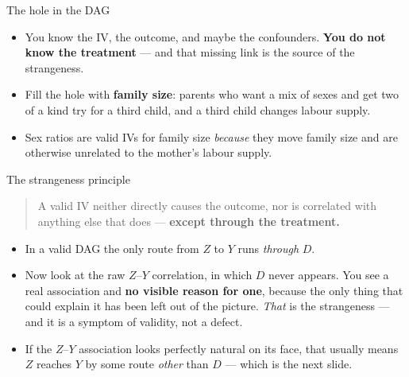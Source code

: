 \documentclass[
  11pt,
  ignorenonframetext,
  aspectratio=169,
]{beamer}
\providecommand{\tightlist}{%
  \setlength{\itemsep}{0pt}\setlength{\parskip}{0pt}}
\begin{document}
\begin{frame}{The hole in the DAG}
\protect{}\label{the-hole-in-the-dag}
\begin{center}
\end{center}

\begin{itemize}
\tightlist
\item
  You know the IV, the outcome, and maybe the confounders. \textbf{You
  do not know the treatment} --- and that missing link is the source of
  the strangeness.
\item
  Fill the hole with \textbf{family size}: parents who want a mix of
  sexes and get two of a kind try for a third child, and a third child
  changes labour supply.
\item
  Sex ratios are valid IVs for family size \emph{because} they move
  family size and are otherwise unrelated to the mother's labour supply.
\end{itemize}
\end{frame}

\begin{frame}{The strangeness principle}
\protect{}\label{the-strangeness-principle-1}
\begin{quote}
A valid IV neither directly causes the outcome, nor is correlated with
anything else that does --- \textbf{except through the treatment.}
\end{quote}

\begin{itemize}
\tightlist
\item
  In a valid DAG the only route from \(Z\) to \(Y\) runs \emph{through}
  \(D\).
\item
  Now look at the raw \(Z\)--\(Y\) correlation, in which \(D\) never
  appears. You see a real association and \textbf{no visible reason for
  one}, because the only thing that could explain it has been left out
  of the picture. \emph{That} is the strangeness --- and it is a symptom
  of validity, not a defect.
\item
  If the \(Z\)--\(Y\) association looks perfectly natural on its face,
  that usually means \(Z\) reaches \(Y\) by some route \emph{other} than
  \(D\) --- which is the next slide.
\end{itemize}
\end{frame}
\end{document}
